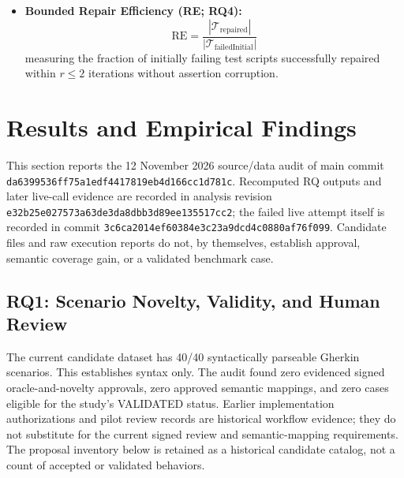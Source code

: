 \documentclass[pdflatex,sn-mathphys-num]{sn-jnl}
\begin{document}
\begin{itemize}
\begin{equation}
    \end{equation}
    A 3/3 rerun result is necessary but not sufficient for benchmark acceptance. Acceptance also requires signed novelty and oracle review, an approved semantic mapping, source and fixture provenance, a meaningful business assertion, and verified cleanup.
    \item \textbf{Bounded Repair Efficiency (RE; RQ4):}
    \begin{equation}
        \text{RE} = \frac{|\mathcal{T}_{\text{repaired}}|}{|\mathcal{T}_{\text{failedInitial}}|}
    \end{equation}
    measuring the fraction of initially failing test scripts successfully repaired within $r \le 2$ iterations without assertion corruption.
\end{itemize}


\section{Results and Empirical Findings}\label{sec:results}

This section reports the 12 November 2026 source/data audit of main commit \texttt{da6399536ff75a1edf4417819eb4d166cc1d781c}. Recomputed RQ outputs and later live-call evidence are recorded in analysis revision \texttt{e32b25e027573a63de3da8dbb3d89ee135517cc2}; the failed live attempt itself is recorded in commit \texttt{3c6ca2014ef60384e3c23a9dcd4c0880af76f099}. Candidate files and raw execution reports do not, by themselves, establish approval, semantic coverage gain, or a validated benchmark case.

\subsection{RQ1: Scenario Novelty, Validity, and Human Review}

The current candidate dataset has 40/40 syntactically parseable Gherkin scenarios. This establishes syntax only. The audit found zero evidenced signed oracle-and-novelty approvals, zero approved semantic mappings, and zero cases eligible for the study's VALIDATED status. Earlier implementation authorizations and pilot review records are historical workflow evidence; they do not substitute for the current signed review and semantic-mapping requirements. The proposal inventory below is retained as a historical candidate catalog, not a count of accepted or validated behaviors.
\end{document}
